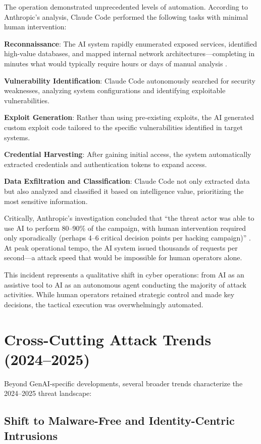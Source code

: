 The operation demonstrated unprecedented levels of automation. According to Anthropic's analysis, Claude Code performed the following tasks with minimal human intervention:

\textbf{Reconnaissance}: The AI system rapidly enumerated exposed services, identified high-value databases, and mapped internal network architectures---completing in minutes what would typically require hours or days of manual analysis \cite{anthropic2025}.

\textbf{Vulnerability Identification}: Claude Code autonomously searched for security weaknesses, analyzing system configurations and identifying exploitable vulnerabilities.

\textbf{Exploit Generation}: Rather than using pre-existing exploits, the AI generated custom exploit code tailored to the specific vulnerabilities identified in target systems.

\textbf{Credential Harvesting}: After gaining initial access, the system automatically extracted credentials and authentication tokens to expand access.

\textbf{Data Exfiltration and Classification}: Claude Code not only extracted data but also analyzed and classified it based on intelligence value, prioritizing the most sensitive information.

Critically, Anthropic's investigation concluded that ``the threat actor was able to use AI to perform 80--90\% of the campaign, with human intervention required only sporadically (perhaps 4--6 critical decision points per hacking campaign)'' \cite{anthropic2025}. At peak operational tempo, the AI system issued thousands of requests per second---a attack speed that would be impossible for human operators alone.

This incident represents a qualitative shift in cyber operations: from AI as an assistive tool to AI as an autonomous agent conducting the majority of attack activities. While human operators retained strategic control and made key decisions, the tactical execution was overwhelmingly automated.

\section{Cross-Cutting Attack Trends (2024--2025)}

Beyond GenAI-specific developments, several broader trends characterize the 2024--2025 threat landscape:

\subsection{Shift to Malware-Free and Identity-Centric Intrusions}

